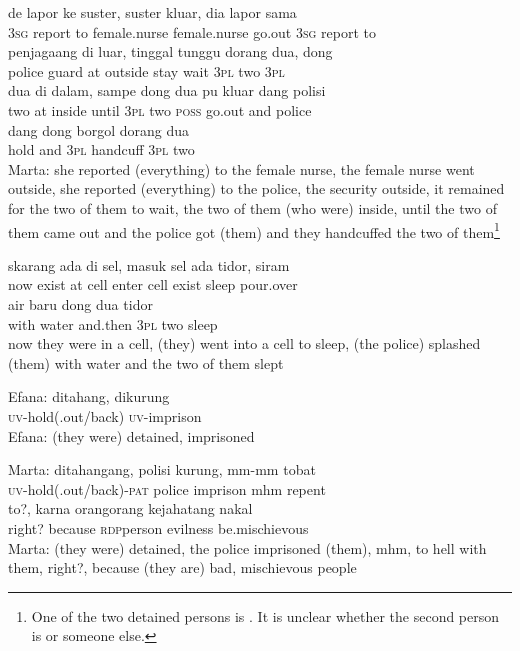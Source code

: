 \ea
{}    {de}    {lapor}    {ke}    {suster,}    {suster}    {kluar,}    {dia}    {lapor}    {sama}\\
   {}    {\textsc{3sg}}    {report}    {to}    {female.nurse}    {female.nurse}    {go.out}    {\textsc{3sg}}    {report}    {to}\\
    {penjagaang}    {di}    {luar,}    {tinggal}    {tunggu}    {dorang}    {dua,}   dong\\
   {police}    {guard}    {at}    {outside}    {stay}    {wait}    {\textsc{3pl}}    {two}   \textsc{3pl}\\
\gll dua    {di}    {dalam,}    {sampe}    {dong}   dua    {pu}    {kluar}    {dang}    {polisi}\\
  two    {at}    {inside}    {until}    {\textsc{3pl}}   two    {\textsc{poss}}    {go.out}    {and}    {police}\\
    {dang}    {dong}    {borgol}    {dorang}    {dua}\\
   {hold}    {and}    {\textsc{3pl}}    {handcuff}    {\textsc{3pl}}    {two}\\
\glt
Marta: she reported (everything) to the female nurse, the female nurse went outside, she reported (everything) to the police, the security outside, it remained for the two of them to wait, the two of them (who were) inside, until the two of them came out and the police got (them) and they handcuffed the two of them\footnote{One of the two detained persons is . It is unclear whether the second person is  or someone else.}
\z

\ea
\gll   skarang    {ada}    {di}   sel,    {masuk}    {sel}    {ada}   tidor,   siram\\
  now    {exist}    {at}   cell    {enter}    {cell}    {exist}   sleep   pour.over\\
    {air}    {baru}    {dong}    {dua}    {tidor}\\
   {with}    {water}    {and.then}    {\textsc{3pl}}    {two}    {sleep}\\
\glt
now they were in a cell, (they) went into a cell to sleep, (the police) splashed (them) with water and the two of them slept
\z

\ea
\gll   Efana:   ditahang,   dikurung\\
{}  \textsc{uv}{}-hold(.out/back)   \textsc{uv}{}-imprison\\
\glt
Efana: (they were) detained, imprisoned
\z

\ea
\gll   Marta:    {ditahangang,}    {polisi}    {kurung,}   mm-mm   tobat\\
 {}   {\textsc{uv}{}-hold(.out/back)-\textsc{pat}}    {police}    {imprison}   mhm   repent\\
 \gll  to?,   karna    {orang{\Tilde}orang}    {kejahatang}    {nakal}\\
  right?   because    {\textsc{rdp}{\Tilde}person}    {evilness}    {be.mischievous}\\
\glt
Marta: (they were) detained, the police imprisoned (them), mhm, to hell with them, right?, because (they are) bad, mischievous people
\z %

